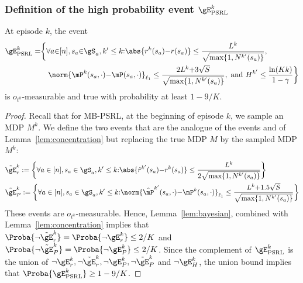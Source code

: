 \begin{subappendices}
\subsubsection{Definition of the high probability event $\gE_\text{PSRL}^{k}$}

\begin{lem}
    \label{lem:concentration_psrl}
    At episode $k$, the event
    \begin{align*}
        \gE_\text{PSRL}^{k} =
        &\bigg\{ \forall a{\in}[n], s_a{\in}\gS_a, k'\le k{:}
            \abs{r^{k}(s_a){-}r(s_a)} \le\frac{L^{k}}{\sqrt{\max\{1,N^{k'}(s_a)\} }}, \\
        &\quad\norm{\mP^{k}(s_a,\cdot) {-}\mP(s_a,\cdot)}_{\ell_1} \le\frac{2L^{k}{+}3\sqrt{S}}{\sqrt{\max\{1,N^{k'}(s_a)\} }}, \text{ and } H^{k'}\le \frac{\ln(Kk)}{1-\gamma} \bigg\}
    \end{align*}
    is $o_{t^k}$-measurable and true with probability at least $1-9/K$.
\end{lem}

\begin{proof}
    Recall that for MB-PSRL, at the beginning of episode $k$, we sample an MDP $M^{k}$. We define the two events that are the analogue of the events  and  of Lemma~\ref{lem:concentration} but replacing the true MDP $M$ by the sampled MDP $M^{k}$: 
    \begin{align*}
        &\tilde{\gE}^{k}_r:= \bigg\{\forall a\in[n], s_a\in\gS_a, k'\le k{:} \abs{\hat{r}^{k'}(s_a){-}r^{k}(s_a)} \le \frac{L^{k}}{2\sqrt{\max\{1,N^{k'}(s_a)\} }}\bigg\} \\
        &\tilde{\gE}^{k}_P:= \bigg\{\forall a\in[n], s_a\in\gS_a, k'\le k{:} \norm{\hat{\mP}^{k'}(s_a,\cdot){-}\mP^{k}(s_a, \cdot)}_{\ell_1} \le \frac{L^{k}{+}1.5\sqrt{S}}{\sqrt{\max\{1,N^{k'}(s_a)\} }}\bigg\} 
    \end{align*}
    These events are $o_{t^k}$-measurable. Hence, Lemma~\ref{lem:bayesian}, combined with Lemma~\ref{lem:concentration} implies that $\Proba{ \lnot \tilde{\gE}^{k}_r} =\Proba{ \lnot \gE^{k}_r}\le 2/K$ and $\Proba{\lnot \tilde{\gE}^{k}_P}=\Proba{ \lnot \gE^{k}_P}\le 2/K$. Since the complement of $\gE^{k}_\text{PSRL}$ is the union of $\lnot \gE^{k}_r, \lnot \tilde{\gE}^{k}_r, \lnot \gE^{k}_P, \lnot \tilde{\gE}^{k}_P$ and $\lnot \gE^{k}_H$, the union bound implies that $\Proba{\gE_\text{PSRL}^{k}}\ge1-9/K$.
\end{proof}


\end{subappendices}
